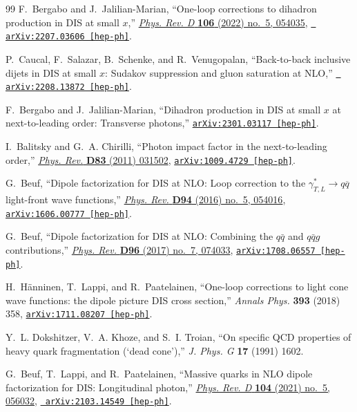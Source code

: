\begin{thebibliography}{99}
F.~Bergabo and J.~Jalilian-Marian, ``{One-loop corrections to dihadron
  production in DIS at small $x$},''
  \href{http://dx.doi.org/10.1103/PhysRevD.106.054035}{{\em Phys. Rev. D} {\bf
  106} (2022) no.~5, 054035}, \href{http://arxiv.org/abs/2207.03606}{{\tt
  arXiv:2207.03606 [hep-ph]}}.

P.~Caucal, F.~Salazar, B.~Schenke, and R.~Venugopalan, ``{Back-to-back
  inclusive dijets in DIS at small $x$: Sudakov suppression and gluon
  saturation at NLO},'' \href{http://arxiv.org/abs/2208.13872}{{\tt
  arXiv:2208.13872 [hep-ph]}}.

F.~Bergabo and J.~Jalilian-Marian, ``{Dihadron production in DIS at small $x$ at next-to-leading order: Transverse photons},'' \href{http://arxiv.org/abs/2301.03117}{{\tt arXiv:2301.03117 [hep-ph]}}.

I.~Balitsky and G.~A. Chirilli, ``{Photon impact factor in the next-to-leading
  order},'' \href{http://dx.doi.org/10.1103/PhysRevD.83.031502}{{\em Phys.
  Rev.} {\bf D83} (2011)  031502},
\href{http://arxiv.org/abs/1009.4729}{{\tt arXiv:1009.4729 [hep-ph]}}.

G.~Beuf, ``{Dipole factorization for DIS at NLO: Loop correction to the
  $\gamma^*_{T,L}\to q\overline q$ light-front wave functions},''
  \href{http://dx.doi.org/10.1103/PhysRevD.94.054016}{{\em Phys. Rev.} {\bf
  D94} (2016) no.~5, 054016},
\href{http://arxiv.org/abs/1606.00777}{{\tt arXiv:1606.00777 [hep-ph]}}.

G.~Beuf, ``{Dipole factorization for DIS at NLO: Combining the $q\bar{q}$ and
  $q\bar{q}g$ contributions},''
  \href{http://dx.doi.org/10.1103/PhysRevD.96.074033}{{\em Phys. Rev.} {\bf
  D96} (2017) no.~7, 074033},
\href{http://arxiv.org/abs/1708.06557}{{\tt arXiv:1708.06557 [hep-ph]}}.

H.~H\"anninen, T.~Lappi, and R.~Paatelainen, ``{One-loop corrections to light cone wave functions: the dipole picture DIS cross section},'' {\em Annals Phys.} {\bf 393} (2018) 358, \href{http://arxiv.org/abs/1711.08207}{{\tt arXiv:1711.08207 [hep-ph]}}.

Y.~L. Dokshitzer, V.~A. Khoze, and S.~I. Troian, ``{On specific QCD properties of heavy quark fragmentation (`dead cone')},'' {\em J. Phys. G} {\bf 17} (1991) 1602.

G.~Beuf, T.~Lappi, and R.~Paatelainen, ``{Massive quarks in NLO dipole
  factorization for DIS: Longitudinal photon},''
  \href{http://dx.doi.org/10.1103/PhysRevD.104.056032}{{\em Phys. Rev. D} {\bf
  104} (2021) no.~5, 056032}, \href{http://arxiv.org/abs/2103.14549}{{\tt
  arXiv:2103.14549 [hep-ph]}}.


\end{thebibliography}
